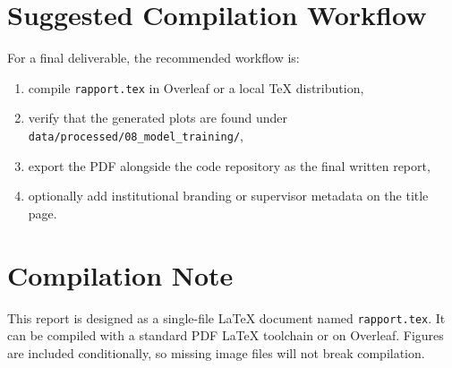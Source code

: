 \documentclass[11pt,a4paper]{article}
\newcommand{\code}[1]{\texttt{#1}}
\begin{document}
\section{Suggested Compilation Workflow}

For a final deliverable, the recommended workflow is:

\begin{enumerate}
\item compile \code{rapport.tex} in Overleaf or a local TeX distribution,
\item verify that the generated plots are found under \code{data/processed/08\_model\_training/},
\item export the PDF alongside the code repository as the final written report,
\item optionally add institutional branding or supervisor metadata on the title page.
\end{enumerate}

\section{Compilation Note}

This report is designed as a single-file LaTeX document named \code{rapport.tex}. It can be compiled with a standard PDF LaTeX toolchain or on Overleaf. Figures are included conditionally, so missing image files will not break compilation.
\end{document}
